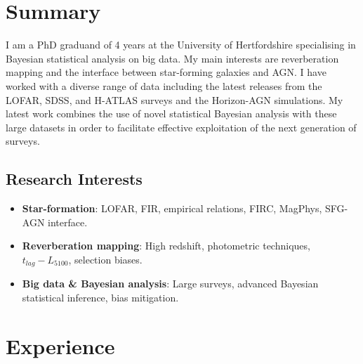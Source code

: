 \documentclass[letterpaper]{twentysecondcv} %
\begin{document}
\makeprofile %
 

\section{Summary}
     I am a PhD graduand of 4 years at the University of Hertfordshire specialising in Bayesian statistical analysis on big data. 
My main interests are reverberation mapping and the interface between star-forming galaxies and AGN. 
I have worked with a diverse range of data including the latest releases from the LOFAR, SDSS, and H-ATLAS surveys and the Horizon-AGN simulations. 
My latest work combines the use of novel statistical Bayesian analysis with these large datasets in order to facilitate effective exploitation of the 
next generation of surveys.


\subsection{Research Interests}
\begin{itemize}
     \item \textbf{Star-formation}: LOFAR, FIR, empirical relations, FIRC, MagPhys, SFG-AGN interface.
 \item \textbf{Reverberation mapping}: High redshift, photometric techniques, $t_{lag}-L_{5100}$, selection
biases.
 \item \textbf{Big data \& Bayesian analysis}: Large surveys, advanced Bayesian statistical inference, bias mitigation.
\end{itemize}

\section{Experience}
\end{document}
